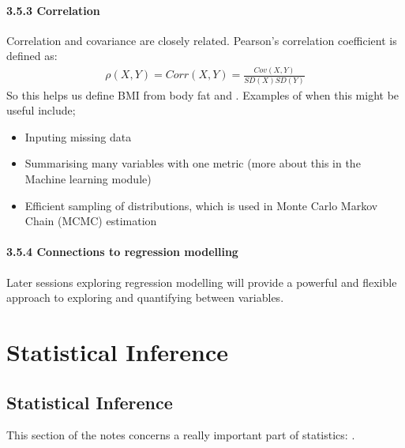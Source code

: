 \documentclass[letterpaper,10pt,english]{jupyterBook}
\begin{document}
\subsection{3.5.3  Correlation}
\label{\detokenize{03.f. Continuous Probability Distributions:correlation}}
\sphinxAtStartPar
Correlation and covariance are closely related.  Pearson’s correlation coefficient is defined as:
\begin{equation*}
\begin{split} 
\rho(X,Y) = Corr(X,Y) = \frac{Cov(X,Y)}{SD(X)SD(Y)}
\end{split}
\end{equation*}
\sphinxAtStartPar
So this helps us define BMI from body fat and . Examples of when this might be useful include;
\begin{itemize}
\item {} 
\sphinxAtStartPar
Inputing missing data

\item {} 
\sphinxAtStartPar
Summarising many variables with one metric (more about this in the Machine learning module)

\item {} 
\sphinxAtStartPar
Efficient sampling of distributions, which is used in Monte Carlo Markov Chain (MCMC) estimation

\end{itemize}


\subsection{3.5.4 Connections to regression modelling}
\label{\detokenize{03.f. Continuous Probability Distributions:connections-to-regression-modelling}}
\sphinxAtStartPar
Later sessions exploring regression modelling will provide a powerful and flexible approach to exploring and quantifying  between variables.


\part{Statistical Inference}


\chapter{Statistical Inference}
\label{\detokenize{04. Inference.Intro:statistical-inference}}\label{\detokenize{04. Inference.Intro::doc}}
\sphinxAtStartPar
This section of the notes concerns a really important part of statistics: .
\end{document}
